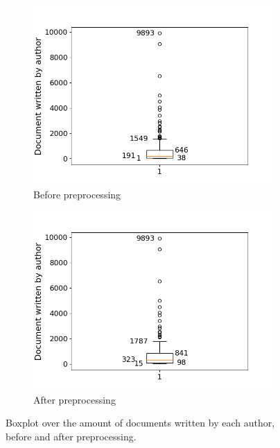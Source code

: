 \begin{figure}[ht]
	\centering
	\begin{subfigure}{0.45\textwidth}
		\centering
		\includegraphics[width=\linewidth]{figures/author_box_before.png}
		\caption{Before preprocessing}
		\label{fig:author_box_before}
	\end{subfigure}
	\begin{subfigure}{0.45\textwidth}
		\centering
		\includegraphics[width=\linewidth]{figures/author_box_14.png}
		\caption{After preprocessing}
		\label{fig:auhtor_box_after}
	\end{subfigure}
	\caption{Boxplot over the amount of documents written by each author, before and after preprocessing.}
	\label{fig:author_box}
\end{figure}


